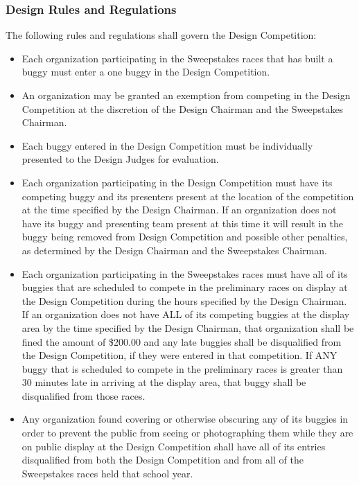 \subsubsection*{Design Rules and Regulations}
	
	The following rules and regulations shall govern the Design Competition:

	\begin{itemize}

		\item
		Each organization participating in the Sweepstakes races that has built a buggy must enter a one buggy in the Design Competition.

        \item An organization may be granted an exemption from competing in the Design Competition at the discretion of the Design Chairman and the Sweepstakes Chairman.

		\item
		Each buggy entered in the Design Competition must be individually presented to the Design Judges for evaluation.

        \item Each organization participating in the Design Competition must have its competing buggy and its presenters present at the location of the competition at the time specified by the Design Chairman. If an organization does not have its buggy and presenting team present at this time it will result in the buggy being removed from Design Competition and possible other penalties, as determined by the Design Chairman and the Sweepstakes Chairman.

		\item
		Each organization participating in the Sweepstakes races must have all of its buggies that are scheduled to compete in the preliminary races on display at the Design Competition during the hours specified by the Design Chairman. If an organization does not have ALL of its competing buggies at the display area by the time specified by the Design Chairman, that organization shall be fined the amount of \$200.00 and any late buggies shall be disqualified from the Design Competition, if they were entered in that competition. If ANY buggy that is scheduled to compete in the preliminary races is greater than 30 minutes late in arriving at the display area, that buggy shall be disqualified from those races.

		\item
		Any organization found covering or otherwise obscuring any of its buggies in order to prevent the public from seeing or photographing them while they are on public display at the Design Competition shall have all of its entries disqualified from both the Design Competition and from all of the Sweepstakes races held that school year.

	\end{itemize}

